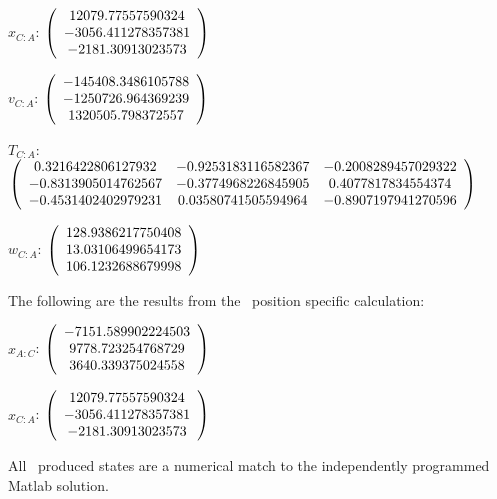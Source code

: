 \begin{description}
$x_{C:A}$: $\left( \begin{array} {ccc} 12079.77557590324 \\    -3056.411278357381 \\     -2181.30913023573
\end{array} \right)\\ \\$

$v_{C:A}$:  $\left( \begin{array} {ccc}  -145408.3486105788 \\    -1250726.964369239 \\     1320505.798372557
\end{array} \right)\\ \\$

$T_{C:A}$: $\left( \begin{array} {ccc}
0.3216422806127932 &   -0.9253183116582367 &   -0.2008289457029322 \\
 -0.8313905014762567 &   -0.3774968226845905 &    0.4077817834554374 \\
  -0.4531402402979231 &   0.03580741505594964 &   -0.8907197941270596 \\
\end{array} \right)\\ \\$

$w_{C:A}$:  $\left( \begin{array} {ccc}
 128.9386217750408 \\     13.03106499654173 \\     106.1232688679998
\end{array} \right)\\ \\$


The following are the results from the \ position specific calculation:

$x_{A:C}$: $\left( \begin{array} {ccc}  -7151.589902224503 \\     9778.723254768729 \\     3640.339375024558
\end{array} \right)\\ \\$

$x_{C:A}$: $\left( \begin{array} {ccc} 12079.77557590324 \\    -3056.411278357381 \\     -2181.30913023573
\end{array} \right)\\ \\$

All \ produced states are a numerical match to the independently programmed Matlab solution.

\end{description}

